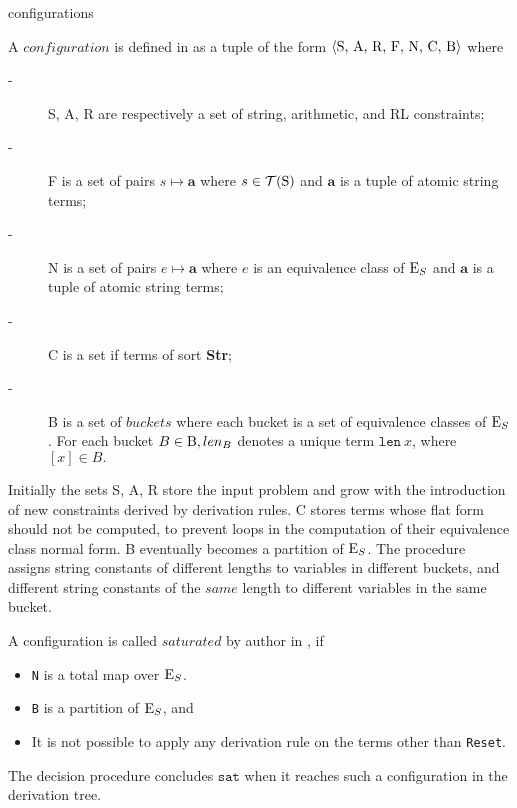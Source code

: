 \begin{definition}{configurations}
\end{definition}
 A \(configuration\) is defined in \cite{main-paper} as a tuple of the form \( \langle \textnormal{S, A, R, F, N, C, B} \rangle \) where	
	\begin{description}	
		\item[-] S, A, R are respectively a set of string, arithmetic, and RL constraints;
		\item[-] F is a set of pairs $ s \mapsto \mathbf{a} $ where $ s \in \mathcal{T}(\textnormal{S})$ and $\mathbf{a}$ is a tuple of atomic string terms;
		\item[-] N is a set of pairs $ e \mapsto \mathbf{a} $ where $e$  is an equivalence class of \( \textnormal{E}_S \) and $\mathbf{a}$ is a tuple of atomic string terms;
		\item[-] C is a set if terms of sort \textbf{Str};
		\item[-] B is a set of $buckets$ where each bucket is a set of equivalence classes of \( \textnormal{E}_S \). For each bucket $ B \in \textnormal{B}, len_B$ denotes a unique term $\texttt{len}\ x$, where $[x] \in B.$
	\end{description}
	Initially the sets S, A, R store the input problem and grow with the introduction of new constraints derived by derivation rules. C stores terms whose flat form should not be computed, to prevent loops in the computation of their equivalence class normal form. B eventually becomes a partition of \( \textnormal{E}_S \). The procedure assigns string constants of different lengths to variables in different buckets, and different string constants of the $same$ length to different variables in the same bucket.
	
	A configuration is called $saturated$ by author in \cite{main-paper}, if
    \begin{itemize}
	   	\item \texttt{N} is a total map over \( \textnormal{E}_S \).
	   	\item \texttt{B} is a partition of \( \textnormal{E}_S \), and
	   	\item It is not possible to apply any derivation rule on the terms other than \texttt{Reset}.
	\end{itemize}
	The decision procedure concludes $\texttt{sat}$ when it reaches such a configuration in the derivation tree.
	
